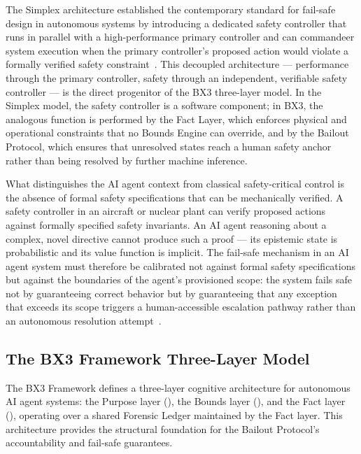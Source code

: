 The Simplex architecture established the contemporary standard for fail-safe design in autonomous systems by introducing a dedicated safety controller that runs in parallel with a high-performance primary controller and can commandeer system execution when the primary controller's proposed action would violate a formally verified safety constraint~\cite{bansal2019}. This decoupled architecture --- performance through the primary controller, safety through an independent, verifiable safety controller --- is the direct progenitor of the BX3 three-layer model. In the Simplex model, the safety controller is a software component; in BX3, the analogous function is performed by the Fact Layer, which enforces physical and operational constraints that no Bounds Engine can override, and by the Bailout Protocol, which ensures that unresolved states reach a human safety anchor rather than being resolved by further machine inference.

What distinguishes the AI agent context from classical safety-critical control is the absence of formal safety specifications that can be mechanically verified. A safety controller in an aircraft or nuclear plant can verify proposed actions against formally specified safety invariants. An AI agent reasoning about a complex, novel directive cannot produce such a proof --- its epistemic state is probabilistic and its value function is implicit. The fail-safe mechanism in an AI agent system must therefore be calibrated not against formal safety specifications but against the boundaries of the agent's provisioned scope: the system fails safe not by guaranteeing correct behavior but by guaranteeing that any exception that exceeds its scope triggers a human-accessible escalation pathway rather than an autonomous resolution attempt~\cite{dijkstra1982,wiener1948,bansal2019}.

\subsection{The BX3 Framework Three-Layer Model}
\label{sec:bx3model}

The BX3 Framework defines a three-layer cognitive architecture for autonomous AI agent systems: the Purpose layer (\purpose{}), the Bounds layer (\bounds{}), and the Fact layer (\fact{}), operating over a shared Forensic Ledger maintained by the Fact layer. This architecture provides the structural foundation for the Bailout Protocol's accountability and fail-safe guarantees.

